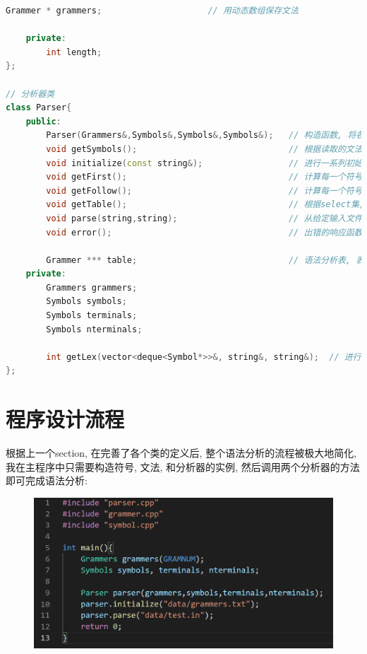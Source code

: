 \documentclass{zpt}
\begin{document}
\begin{lstlisting}[language=c++]
        Grammer * grammers;                     // 用动态数组保存文法

    private:
        int length;
};

// 分析器类
class Parser{
    public:
        Parser(Grammers&,Symbols&,Symbols&,Symbols&);   // 构造函数, 将各个成员赋值
        void getSymbols();                              // 根据读取的文法, 更新终结符
        void initialize(const string&);                 // 进行一系列初始化操作, 包括构建三个符号集, 读取文法等
        void getFirst();                                // 计算每一个符号的first集
        void getFollow();                               // 计算每一个符号的follow集
        void getTable();                                // 根据select集, 构建分析表
        void parse(string,string);                      // 从给定输入文件读取输入并分词, 然后写入给定输出文件中, 之后进行语法分析
        void error();                                   // 出错的响应函数

        Grammer *** table;                              // 语法分析表, 表的单元是语法类的指针
    private:
        Grammers grammers;
        Symbols symbols;
        Symbols terminals;
        Symbols nterminals;

        int getLex(vector<deque<Symbol*>>&, string&, string&);  // 进行词法分析的函数
};
    \end{lstlisting}

    \section{程序设计流程}
    根据上一个section, 在完善了各个类的定义后, 整个语法分析的流程被极大地简化, 我在主程序中只需要构造符号, 文法, 和分析器的实例, 然后调用两个分析器的方法即可完成语法分析:
    \begin{figure}[H]
        \centering
        \includegraphics[width=\textwidth]{../resources/main.png}
    \end{figure}
\end{document}
